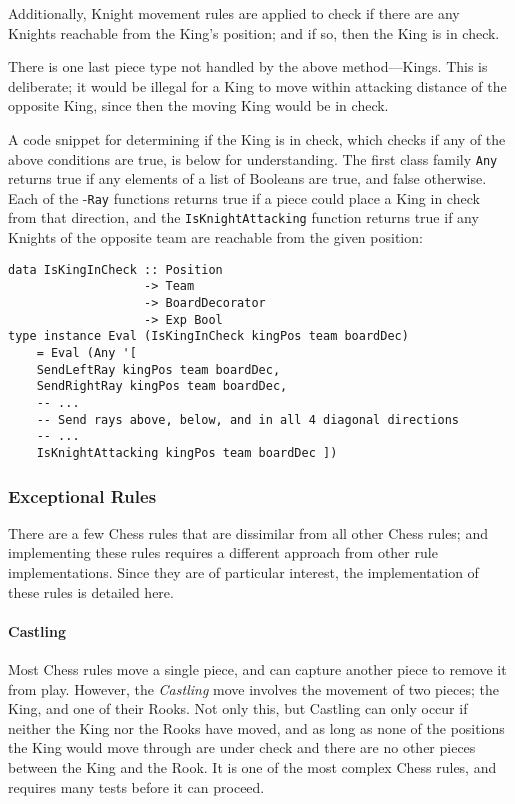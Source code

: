 \documentclass[12pt, a4paper, bibliography=totocnumbered]{scrreprt}
\newcommand{\inline}[1]{\lstinline[basicstyle=\ttfamily\footnotesize]{#1}}
\begin{document}
Additionally, Knight movement rules are applied to check if there are any Knights reachable from the King's position; and if so, then the King is in check.

There is one last piece type not handled by the above method---Kings. This is deliberate; it would be illegal for a King to move within attacking distance of the opposite King, since then the moving King would be in check.

A code snippet for determining if the King is in check, which checks if any of the above conditions are true, is below for understanding. The first class family \inline{Any} returns true if any elements of a list of Booleans are true, and false otherwise. Each of the -\inline{Ray} functions returns true if a piece could place a King in check from that direction, and the \inline{IsKnightAttacking} function returns true if any Knights of the opposite team are reachable from the given position:

\begin{lstlisting}
data IsKingInCheck :: Position
                   -> Team
                   -> BoardDecorator
                   -> Exp Bool
type instance Eval (IsKingInCheck kingPos team boardDec)
    = Eval (Any '[
    SendLeftRay kingPos team boardDec,
    SendRightRay kingPos team boardDec,
    -- ...
    -- Send rays above, below, and in all 4 diagonal directions
    -- ...
    IsKnightAttacking kingPos team boardDec ])
\end{lstlisting}

\subsubsection{Exceptional Rules}

There are a few Chess rules that are dissimilar from all other Chess rules; and implementing these rules requires a different approach from other rule implementations. Since they are of particular interest, the implementation of these rules is detailed here.

\paragraph{Castling} \label{castlesection}

Most Chess rules move a single piece, and can capture another piece to remove it from play. However, the \emph{Castling} move involves the movement of two pieces; the King, and one of their Rooks. Not only this, but Castling can only occur if neither the King nor the Rooks have moved, and as long as none of the positions the King would move through are under check and there are no other pieces between the King and the Rook. It is one of the most complex Chess rules, and requires many tests before it can proceed.
\end{document}

